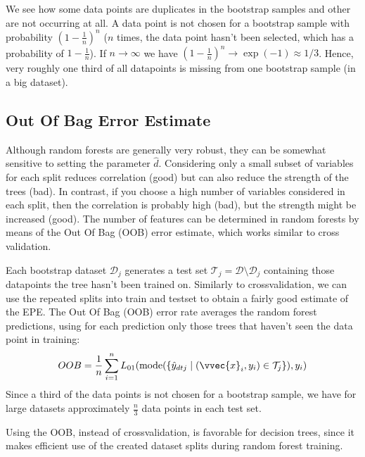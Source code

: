 \documentclass[letterpaper,10pt,english]{jupyterBook}
\begin{document}
\sphinxAtStartPar
We see how some data points are duplicates in the bootstrap samples and other are not occurring at all. A data point is not chosen for a bootstrap sample with probability \((1-\frac1n)^n\) (\(n\) times, the data point hasn’t been selected, which has a probability of \(1-\frac1n\)). If \(n\rightarrow \infty\) we have \((1-\frac1n)^n\rightarrow \exp(-1)\approx 1/3\). Hence, very roughly one third of all datapoints is missing from one bootstrap sample (in a big dataset).


\subsection{Out Of Bag Error Estimate}
\label{\detokenize{classification_random_forests:out-of-bag-error-estimate}}
\sphinxAtStartPar
Although random forests are generally very robust, they can be somewhat sensitive to setting the parameter \(\hat{d}\). Considering only a small subset of variables for each split reduces correlation (good) but can also reduce the strength of the trees (bad). In contrast, if you choose a high number of variables considered in each split, then the correlation is probably high (bad), but the strength might be increased (good). The number of features can be determined in random forests by means of the Out Of Bag (OOB) error estimate, which works similar to cross validation.

\sphinxAtStartPar
Each bootstrap dataset \(\mathcal{D}_j\) generates a test set \(\mathcal{T}_j=\mathcal{D}\setminus \mathcal{D}_j\) containing those datapoints the tree hasn’t been trained on. Similarly to cross\sphinxhyphen{}validation, we can use the repeated splits into train and testset to obtain a fairly good estimate of the EPE. The Out Of Bag (OOB) error rate averages the random forest predictions, using for each prediction only those trees that haven’t seen the data point in training:
\begin{equation*}
\begin{split}OOB = \frac1n\sum_{i=1}^n L_{01}(\mathrm{mode}(\{\hat{y}_{dtj}\mid (\vvec{x}_i,y_i)\in\mathcal{T}_j\}),y_i) \end{split}
\end{equation*}
Since a third of the data points is not chosen for a bootstrap sample, we have for large datasets approximately \(\frac n3\) data points in each test set.

\sphinxAtStartPar
Using the OOB, instead of cross\sphinxhyphen{}validation, is favorable for decision trees, since it makes efficient use of the created dataset splits during random forest training.
\end{document}
